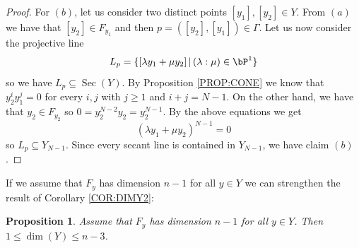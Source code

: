 \documentclass[a4paper,11pt]{amsart}
\newtheorem{proposition}[theorem]{Proposition}
\DeclareMathOperator{\Sec}{Sec}
\begin{document}
\begin{proof}
For $(b)$, let us consider two distinct points $[y_1],[y_2]\in Y$. From $(a)$ we have that $[y_2]\in F_{y_1}$ and then $p=([y_2],[y_1])\in \Gamma$. 
Let us now consider the projective line 
$$L_{p}=\{[\lambda y_1+\mu y_2] \,|\, (\lambda:\mu)\in\bP^1\}$$ so we have $L_{p}\subseteq \Sec(Y)$.
By Proposition \ref{PROP:CONE} we know that $y_2^iy_1^j=0$ for every $i,j$ with $j\ge1$ and $i+j=N-1$. On the other hand, we have that $y_2\in F_{y_2}$ so $0=y_2^{N-2}y_2=y_2^{N-1}$. By the above equations we get
$$(\lambda y_1+\mu y_2)^{N-1}=0$$
so $L_{p}\subseteq Y_{N-1}$.
Since every secant line is contained in $Y_{N-1}$, we have claim $(b)$.
\end{proof}



If we assume that $F_y$ has dimension $n-1$ for all $y\in Y$ we can strengthen the result of Corollary \ref{COR:DIMY2}:

\begin{proposition}
\label{PROP:DIMY3}
Assume that $F_y$ has dimension $n-1$ for all $y\in Y$. Then 
$1 \leq \dim(Y)\leq n-3$.
\end{proposition}
\end{document}
